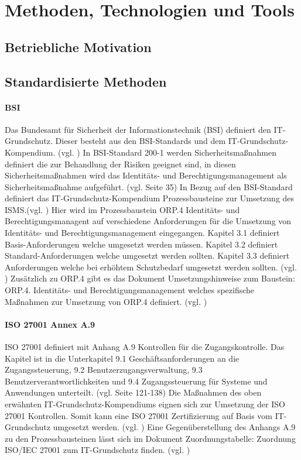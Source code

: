 \documentclass[11pt]{article}
\begin{document}
\section{Methoden, Technologien und Tools}
\label{sec:existing}
\subsection{Betriebliche Motivation}
\subsection{Standardisierte Methoden}
\paragraph{BSI}
Das Bundesamt für Sicherheit der Informationstechnik (BSI) definiert den IT-Grundschutz. Dieser besteht aus den BSI-Standards und dem IT-Grundschutz-Kompendium. (vgl. \cite{bsi2017grundschutz}) In BSI-Standard 200-1 werden Sicherheitsmaßnahmen definiert die zur Behandlung der Risiken geeignet sind, in diesen Sicherheitsmaßnahmen wird das Identitäts- und Berechtigungsmanagement als Sicherheitsmaßnahme aufgeführt. (vgl. \cite{bsi20172001} Seite 35) In Bezug auf den BSI-Standard definiert das IT-Grundschutz-Kompendium Prozessbausteine zur Umsetzung des ISMS.(vgl. \cite{bsi2023kompendium}) Hier wird im Prozessbaustein \glqq{}ORP.4 Identitäts- und Berechtigungsmanagent\grqq{} auf verschiedene Anforderungen für die Umsetzung von Identitäts- und Berechtigungsmanagement eingegangen. Kapitel 3.1 definiert Basis-Anforderungen welche umgesetzt werden müssen. Kapitel 3.2 definiert Standard-Anforderungen welche umgesetzt werden sollten. Kapitel 3.3 definiert Anforderungen welche bei erhöhtem Schutzbedarf umgesetzt werden sollten. (vgl. \cite{orp4}) Zusätzlich zu ORP.4 gibt es das Dokument \glqq{}Umsetzungshinweise zum Baustein: ORP.4. Identitäts- und Berechtigungsmanagement\grqq{} welches spezifische Maßnahmen zur Umsetzung von ORP.4 definiert. (vgl. \cite{bsi2022umsetzungshinweiseorp4})
\paragraph{ISO 27001 Annex A.9}
ISO 27001 definiert mit Anhang A.9 Kontrollen für die Zugangskontrolle. Das Kapitel ist in die Unterkapitel \glqq{}9.1 Geschäftsanforderungen an die Zugangssteuerung\grqq{}, \glqq{}9.2 Benutzerzugangsverwaltung\grqq{}, \glqq{}9.3 Benutzerverantwortlichkeiten\grqq{} und \glqq{}9.4 Zugangssteuerung für Systeme und Anwendungen\grqq{} unterteilt. (vgl. \cite{kersten2020iso27001} Seite 121-138) Die Maßnahmen des oben erwähnten IT-Grundschutz-Kompendiums eignen sich zur Umsetzung der ISO 27001 Kontrollen. Somit kann eine ISO 27001 Zertifizierung auf Basis vom IT-Grundschutz umgesetzt werden. (vgl. \cite{bsi2023iso27001basis}) Eine Gegenüberstellung des Anhangs A.9 zu den Prozessbausteinen lässt sich im Dokument \glqq{}Zuordnungstabelle: Zuordnung ISO/IEC 27001 zum IT-Grundschutz\grqq{} finden. (vgl. \cite{bsi2021map})
\end{document}
